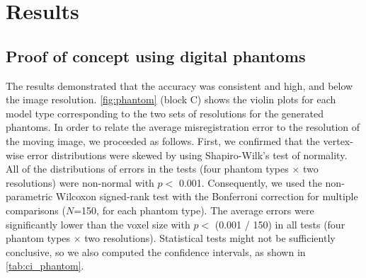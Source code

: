 \section{Results}
\label{sec:results}

\subsection{Proof of concept using digital phantoms}
\label{sec:results_phantom}

The results demonstrated that the accuracy was consistent and high, and below the image resolution.
\autoref{fig:phantom} (block C) shows the violin plots for each model type corresponding
  to the two sets of resolutions for the generated phantoms.
In order to relate the average misregistration error to the resolution of the moving image,
  we proceeded as follows.
First, we confirmed that the vertex-wise error distributions were skewed by using Shapiro-Wilk's test of
  normality.
All of the distributions of errors in the tests (four phantom types $\times$ two resolutions) were
  non-normal with $p<$ 0.001.
Consequently, we used the non-parametric Wilcoxon signed-rank test with the Bonferroni
  correction for multiple comparisons ($N$=150, for each phantom type).
The average errors were significantly lower than the voxel size with $p <$ (0.001 / 150)
  in all tests (four phantom types $\times$ two resolutions).
Statistical tests might not be sufficiently conclusive, so we also computed the confidence intervals,
  as shown in \autoref{tab:ci_phantom}.

